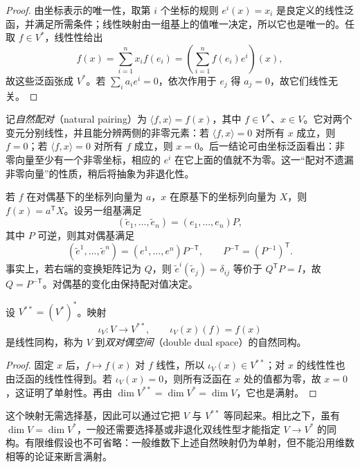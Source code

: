 \begin{proof}
由坐标表示的唯一性，取第 $i$ 个坐标的规则 $e^i(x)=x_i$ 是良定义的线性泛函，并满足所需条件；线性映射由一组基上的值唯一决定，所以它也是唯一的。任取 $f\in V^*$，线性性给出
\[
    f(x)=\sum_{i=1}^n x_i f(e_i)
    =\left(\sum_{i=1}^n f(e_i)e^i\right)(x),
\]
故这些泛函张成 $V^*$。若 $\sum_i a_i e^i=0$，依次作用于 $e_j$ 得 $a_j=0$，故它们线性无关。
\end{proof}

记\emph{自然配对}（natural pairing）为 $\langle f,x\rangle=f(x)$，其中 $f\in V^*$、$x\in V$。它对两个变元分别线性，并且能分辨两侧的非零元素：若 $\langle f,x\rangle=0$ 对所有 $x$ 成立，则 $f=0$；若 $\langle f,x\rangle=0$ 对所有 $f$ 成立，则 $x=0$。后一结论可由坐标泛函看出：非零向量至少有一个非零坐标，相应的 $e^i$ 在它上面的值就不为零。这一“配对不遗漏非零向量”的性质，稍后将抽象为非退化性。

若 $f$ 在对偶基下的坐标列向量为 $a$，$x$ 在原基下的坐标列向量为 $X$，则 $f(x)=a^{\mathsf T}X$。设另一组基满足
\[
    (\widetilde e_1,\ldots,\widetilde e_n)=(e_1,\ldots,e_n)P,
\]
其中 $P$ 可逆，则其对偶基满足
\begin{equation}
\label{eq:bilinear-dual-basis-change}
    (\widetilde e^1,\ldots,\widetilde e^n)
    =(e^1,\ldots,e^n)P^{-\mathsf T},
    \qquad P^{-\mathsf T}=(P^{-1})^{\mathsf T}.
\end{equation}
事实上，若右端的变换矩阵记为 $Q$，则 $\widetilde e^i(\widetilde e_j)=\delta_{ij}$ 等价于 $Q^{\mathsf T}P=I$，故 $Q=P^{-\mathsf T}$。对偶基的变化由保持配对值决定。

\begin{theorem}
\label{thm:bilinear-double-dual}
设 $V^{**}=(V^*)^*$。映射
\[
    \iota_V:V\longrightarrow V^{**},\qquad
    \iota_V(x)(f)=f(x)
\]
是线性同构，称为 $V$ 到\emph{双对偶空间}（double dual space）的自然同构。
\end{theorem}

\begin{proof}
固定 $x$ 后，$f\mapsto f(x)$ 对 $f$ 线性，所以 $\iota_V(x)\in V^{**}$；对 $x$ 的线性性也由泛函的线性性得到。若 $\iota_V(x)=0$，则所有泛函在 $x$ 处的值都为零，故 $x=0$，这证明了单射性。再由 $\dim V^{**}=\dim V^*=\dim V$，它也是满射。
\end{proof}

这个映射无需选择基，因此可以通过它把 $V$ 与 $V^{**}$ 等同起来。相比之下，虽有 $\dim V=\dim V^*$，一般还需要选择基或非退化双线性型才能指定 $V\to V^*$ 的同构。有限维假设也不可省略：一般维数下上述自然映射仍为单射，但不能沿用维数相等的论证来断言满射。


